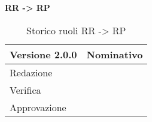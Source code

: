 \textbf{RR -> RP}
\label{tabVers2}
\begin{table}[h]
	\begin{tabular}{p{} p{}}
		\toprule \textbf{Versione 2.0.0}	&	\textbf{Nominativo}\\
		\midrule Redazione	& \VG\\
		\midrule Verifica &	\GP\\
		\midrule Approvazione	& \PM\\
		\bottomrule
	\end{tabular}
	\caption{Storico ruoli RR -> RP}
\end{table}